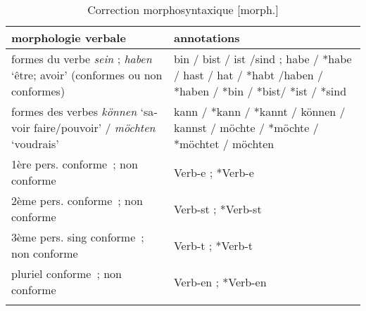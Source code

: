 \documentclass[output=paper]{langscibook}
\begin{document}
\begin{otherlanguage}{french}
\begin{table}
\caption{Correction morphosyntaxique [morph.]}
\begin{tabularx}{\textwidth}{QQ}
\lsptoprule
morphologie verbale & annotations\\\midrule
formes du verbe \textit{sein} ; \textit{haben} `être; avoir' (conformes ou non conformes) & bin / bist / ist /sind ; habe / *habe / hast / hat / *habt /haben / *haben / *bin / *bist/ *ist / *sind\\\addlinespace
formes des verbes \textit{können} `savoir faire/pouvoir' / \textit{möchten} `voudrais' & kann / *kann / *kannt / können / kannst /
möchte / *möchte / *möchtet / möchten\\\addlinespace
1ère pers. conforme ; non conforme & Verb-e ; *Verb-e\\
2ème pers. conforme ; non conforme  & Verb-st ; *Verb-st\\
3ème pers. sing conforme ; non conforme  & Verb-t ; *Verb-t  \\
pluriel conforme ; non conforme  & Verb-en ; *Verb-en\\
\lspbottomrule
\end{tabularx}
\end{table}

\printbibliography[heading=subbibliography,notkeyword=this]
\end{otherlanguage}
\end{document}
